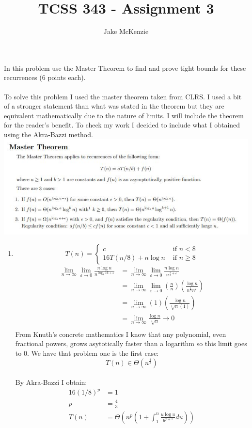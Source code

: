 \documentclass[paper=a4,fontsize=11pt]{article}
\begin{document}
\title{TCSS 343 - Assignment 3}
\author{Jake McKenzie}
\maketitle
In this problem use the Master Theorem to find and prove tight bounds for these recurrences (6 points each).\\\\
To solve this problem I used the master theorem taken from CLRS. I used a bit of a stronger statement than what was stated in the theorem but they are equivalent mathematically due to the nature of limits. I will include the theorem for the reader's benefit. To check my work I decided to include what I obtained using the Akra-Bazzi method.\\
\includegraphics[width=\linewidth]{mastertheorem.JPG}
\begin{enumerate}
\item
\[
T(n) = \left\{
\begin{array}{cl}
c & \textrm{ if } n < 8\\
16T(n/8) + n\log{n} & \textrm{ if } n \geq 8
\end{array}
\right.
\]
\begin{align*}
\lim_{n\to\infty}\lim_{\varepsilon\to0}{\frac{n\log{n}}{n^{\log_{8}{16}+\varepsilon}}}&=\lim_{n\to\infty}\lim_{\varepsilon\to0}{\frac{n\log{n}}{n^{\frac{4}{3}+\varepsilon}}}\\
&=\lim_{n\to\infty}\lim_{\varepsilon\to0}{(\frac{n}{n})(\frac{\log{n}}{n^{\frac{1}{3}}n^{\varepsilon}})}\\
&=\lim_{n\to\infty}{(1)(\frac{\log{n}}{\sqrt[3]{n}(1)})}\\
&=\lim_{n\to\infty}{\frac{\log{n}}{\sqrt[3]{n}}}\rightarrow0\\
\end{align*}
From Knuth's concrete mathematics I know that any polynomial, even fractional powers, grows asytotically faster than a logarithm so this limit goes to 0. We have that problem one is the first case:
$$T(n)\in\Theta(n^{\frac{4}{3}})$$\\
By Akra-Bazzi I obtain:\\
\begin{align*}
16(1/8)^{p}&=1\\
p&=\frac{4}{3}\\
T(n) &= \Theta(n^{p}(1+\int_{1}^{n}{\frac{u\log{u}}{u^{p+1}}du}))\\
\end{align*}
\end{enumerate}
\end{document}
